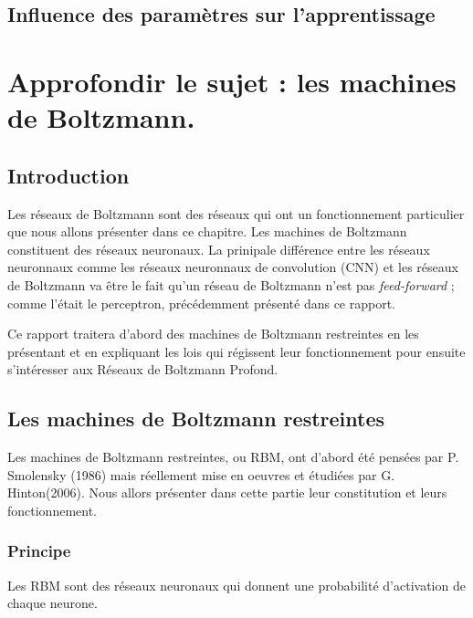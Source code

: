 \documentclass[a4paper,twoside]{report}
\begin{document}
        \chapter{Influence des paramètres sur l'apprentissage}




    \part[Machines de Boltzmann]{Approfondir le sujet : les machines de Boltzmann.}

        \chapter{Introduction}

            Les réseaux de Boltzmann sont des réseaux qui ont un fonctionnement
            particulier que nous allons présenter dans ce chapitre. Les machines de
            Boltzmann constituent des réseaux neuronaux. La prinipale différence entre
            les réseaux neuronnaux comme les réseaux neuronnaux de convolution (CNN) et
            les  réseaux de Boltzmann va être le fait qu'un réseau de Boltzmann n'est
            pas \textit{feed-forward} ; comme l'était le perceptron, précédemment présenté dans ce
            rapport.

            Ce rapport traitera d'abord des machines de Boltzmann restreintes en les
            présentant et en expliquant les lois qui régissent leur fonctionnement pour
            ensuite s'intéresser aux Réseaux de Boltzmann Profond.

        \chapter{Les machines de Boltzmann restreintes}

            Les machines de Boltzmann restreintes, ou RBM, ont d'abord été
            pensées par P. Smolensky (1986) mais réellement mise en oeuvres et
            étudiées par G.
            Hinton(2006). Nous allors présenter dans cette partie leur constitution et
            leurs fonctionnement.

            \section{Principe}

                Les RBM sont des réseaux neuronaux qui donnent une
                probabilité d'activation de chaque neurone.\\
\end{document}
